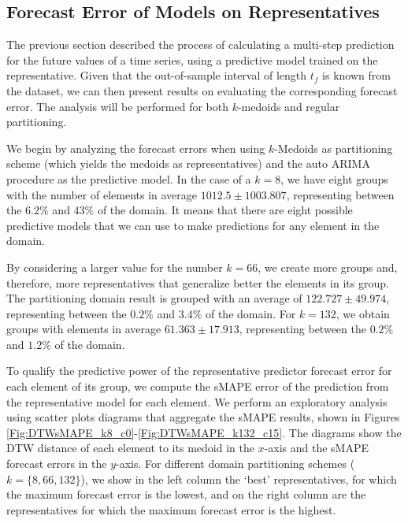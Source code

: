 \subsection{Forecast Error of Models on Representatives}
\label{Sec:AnalyzeForecastErrors}

The previous section described the process of calculating a multi-step prediction for the future values of a time series, using a predictive model trained on the representative. Given that the out-of-sample interval of length $t_f$ is known from the dataset, we can then present results on evaluating the corresponding forecast error. The analysis will be performed for both $k$-medoids and regular partitioning.

We begin by analyzing the forecast errors when using $k$-Medoids as partitioning scheme (which yields the medoids as representatives) and the auto ARIMA procedure as the predictive model. In the case of a $k=8$, we have eight groups with the number of elements in average $1012.5 \pm 1003.807$, representing between the $6.2\%$ and $43\%$ of the domain. It means that there are eight possible predictive models that we can use to make predictions for any element in the domain.

By considering a larger value for the number $k=66$, we create more groups and, therefore, more representatives that generalize better the elements in its group. The partitioning domain result is grouped with an average of $122.727 \pm 49.974$, representing between the $0.2\%$ and $3.4\%$ of the domain. For $k=132$, we obtain groups with elements in average $61.363 \pm 17.913$, representing between the $0.2\%$ and $1.2\%$ of the domain.

To qualify the predictive power of the representative predictor forecast error for each element of its group, we compute the sMAPE error of the prediction from the representative model for each element. We perform an exploratory analysis using scatter plots diagrams that aggregate the sMAPE results, shown in Figures \ref{Fig:DTWsMAPE_k8_c0}-\ref{Fig:DTWsMAPE_k132_c15}. The diagrams show the DTW distance of each element to its medoid in the $x$-axis and the sMAPE forecast errors in the $y$-axis. For different domain partitioning schemes ($k=\{8, 66, 132\}$), we show in the left column the `best' representatives, for which the maximum forecast error is the lowest, and on the right column are the representatives for which the maximum forecast error is the highest.

